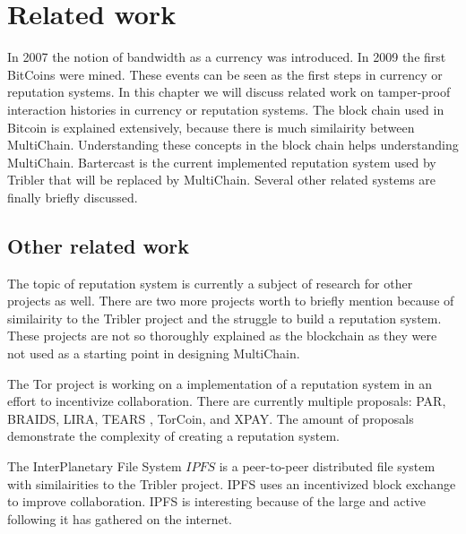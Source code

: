 \chapter{Related work}
In 2007 the notion of bandwidth as a currency was introduced.
In 2009 the first BitCoins were mined.
These events can be seen as the first steps in currency or reputation systems.
In this chapter we will discuss related work on tamper-proof interaction histories in currency or reputation systems.
The block chain used in Bitcoin is explained extensively,
because there is much similairity between MultiChain.
Understanding these concepts in the block chain helps understanding MultiChain.
Bartercast is the current implemented reputation system used by Tribler that will be replaced by MultiChain.
Several other related systems are finally briefly discussed.





\section{Other related work}
The topic of reputation system is currently a subject of research for other projects as well.
There are two more projects worth to briefly mention because of similairity to the Tribler project
and the struggle to build a reputation system.
These projects are not so thoroughly explained as the blockchain
as they were not used as a starting point in designing MultiChain.

The Tor project is working on a implementation of a reputation system in an effort to incentivize collaboration\cite{dingledine-torincentive}.
There are currently multiple proposals: PAR\cite{androulaki-torincentive}, BRAIDS\cite{jansen-braid}, LIRA\cite{jansen-lira}, TEARS \cite{jansen-torincentive}, TorCoin\cite{ghosh-torincentive}, and XPAY\cite{chen-torincentive}.
The amount of proposals demonstrate the complexity of creating a reputation system.

The InterPlanetary File System \(IPFS\) is a peer-to-peer distributed file system with similairities to the Tribler project.
IPFS uses an incentivized block exchange to improve collaboration\cite{benet-ipfs}.
IPFS is interesting because of the large and active following it has gathered on the internet.